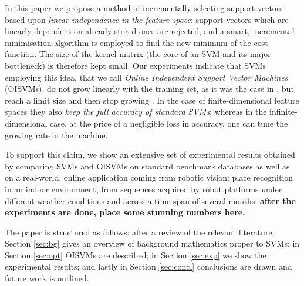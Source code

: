 In this paper we propose a method of incrementally selecting support
vectors based upon \emph{linear independence in the feature space}:
support vectors which are linearly dependent on already stored ones
are rejected, and a smart, incremental minimisation algorithm is
employed to find the new minimum of the cost function. The size of the
kernel matrix (the core of an SVM and its major bottleneck) is
therefore kept small. Our experiments indicate that SVMs employing
this idea, that we call \emph{Online Independent Support Vector
Machines} (OISVMs), do not grow linearly with the training set, as it
was the case in \cite{Steinwart03}, but reach a limit size and then
stop growing \cite{engel2004}. In the case of finite-dimensional
feature spaces they also \emph{keep the full accuracy of standard
SVMs}; whereas in the infinite-dimensional case, at the price of a
negligible loss in accuracy, one can tune the growing rate of the
machine.

To support this claim, we show an extensive set of experimental
results obtained by comparing SVMs and OISVMs on standard benchmark
databases as well as on a real-world, online application coming from
robotic vision: place recognition in an indoor environment, from
sequences acquired by robot platforms under different weather
conditions and across a time span of several months.
{\bf after the experiments are done, place some stunning numbers here.}

The paper is structured as follows: after a review of the relevant
literature, Section \ref{sec:bg} gives an overview of background
mathematics proper to SVMs; in Section \ref{sec:opt} OISVMs are
described; in Section \ref{sec:exp} we show the experimental results;
and lastly in Section \ref{sec:concl} conclusions are drawn and future
work is outlined.
